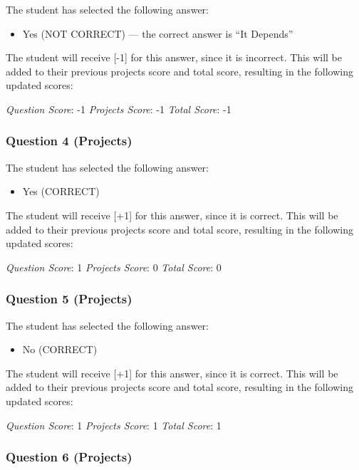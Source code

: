 \documentclass[12pt,twoside]{reedthesis}
\providecommand{\tightlist}{%
  \setlength{\itemsep}{0pt}\setlength{\parskip}{0pt}}
\begin{document}
The student has selected the following answer:
\begin{itemize}
\tightlist
\item
  Yes (NOT CORRECT) --- the correct answer is ``It Depends''
\end{itemize}
The student will receive {[}-1{]} for this answer, since it is incorrect. This will be added to their previous projects score and total score, resulting in the following updated scores:

\emph{Question Score}: -1 \emph{Projects Score}: -1 \emph{Total Score}: -1

\hypertarget{question-4-projects-1}{%
\subsubsection{Question 4 (Projects)}\label{question-4-projects-1}}

The student has selected the following answer:
\begin{itemize}
\tightlist
\item
  Yes (CORRECT)
\end{itemize}
The student will receive {[}+1{]} for this answer, since it is correct. This will be added to their previous projects score and total score, resulting in the following updated scores:

\emph{Question Score}: 1 \emph{Projects Score}: 0 \emph{Total Score}: 0

\hypertarget{question-5-projects-1}{%
\subsubsection{Question 5 (Projects)}\label{question-5-projects-1}}

The student has selected the following answer:
\begin{itemize}
\tightlist
\item
  No (CORRECT)
\end{itemize}
The student will receive {[}+1{]} for this answer, since it is correct. This will be added to their previous projects score and total score, resulting in the following updated scores:

\emph{Question Score}: 1 \emph{Projects Score}: 1 \emph{Total Score}: 1

\hypertarget{question-6-projects-1}{%
\subsubsection{Question 6 (Projects)}\label{question-6-projects-1}}
\end{document}
